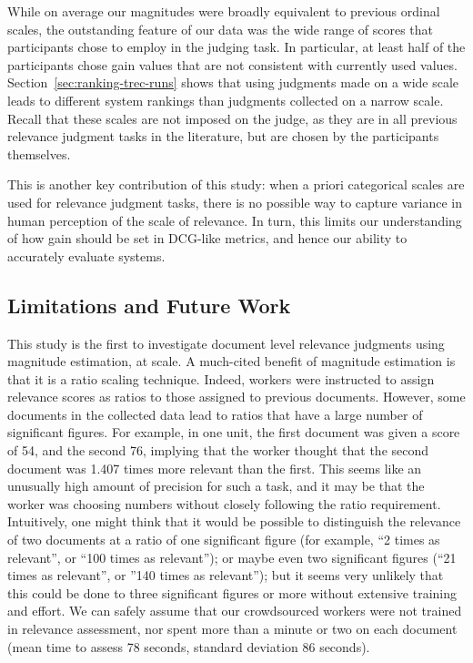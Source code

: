 While on average our magnitudes were broadly equivalent to previous
ordinal scales, the outstanding feature of our data was the wide range
of scores that participants chose to employ in the judging task.
In particular, at least half of the participants chose gain values that
are not consistent with currently used values.
Section~\ref{sec:ranking-trec-runs} shows that using judgments made on
a wide scale leads to different system rankings than judgments
collected on a narrow scale.
Recall that these scales are not imposed on the judge, as they are in
all previous relevance judgment tasks in the literature, but are chosen
by the participants themselves.

This is another key contribution of this study: when a priori
categorical scales are used for relevance judgment tasks, there is no
possible way to capture variance in human perception of the scale of
relevance.
In turn, this limits our understanding of how gain should be set in
DCG-like metrics, and hence our ability to accurately evaluate systems.

\subsection{Limitations and Future Work}
\label{sec:sig-figs}

This study is the first to investigate document level relevance
judgments using magnitude estimation, at scale.
A much-cited benefit of magnitude estimation is that it is a ratio
scaling technique.
Indeed, workers were instructed to assign relevance scores as ratios
to those assigned to previous documents.
However, some documents in the collected data lead to ratios that have
a large number of significant figures.
For example, in one unit, the first document was given a score of 54,
and the second 76, implying that the worker thought that the second
document was 1.407 times more relevant than the first.
This seems like an unusually high amount of precision for such a task,
and it may be that the worker was choosing numbers without closely
following the ratio requirement.
Intuitively, one might think that it would be possible to distinguish
the relevance of two documents at a ratio of one significant figure
(for example, ``2 times as relevant'', or ``100 times as relevant'');
or maybe even two significant figures (``21 times as relevant'', or
''140 times as relevant''); but it seems very unlikely that this could
be done to three significant figures or more without extensive training
and effort.
We can safely assume that our crowdsourced workers were not trained in
relevance assessment, nor spent more than a minute or two on each
document (mean time to assess 78 seconds, standard deviation 86
seconds).

